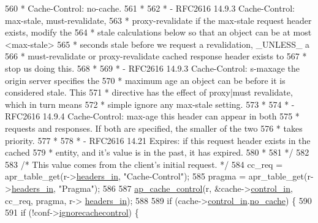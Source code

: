 \begin{DoxyCode}
560 \textcolor{comment}{     * Cache-Control: no-cache.}
561 \textcolor{comment}{     *}
562 \textcolor{comment}{     * - RFC2616 14.9.3 Cache-Control: max-stale, must-revalidate,}
563 \textcolor{comment}{     * proxy-revalidate if the max-stale request header exists, modify the}
564 \textcolor{comment}{     * stale calculations below so that an object can be at most <max-stale>}
565 \textcolor{comment}{     * seconds stale before we request a revalidation, \_UNLESS\_ a}
566 \textcolor{comment}{     * must-revalidate or proxy-revalidate cached response header exists to}
567 \textcolor{comment}{     * stop us doing this.}
568 \textcolor{comment}{     *}
569 \textcolor{comment}{     * - RFC2616 14.9.3 Cache-Control: s-maxage the origin server specifies the}
570 \textcolor{comment}{     * maximum age an object can be before it is considered stale. This}
571 \textcolor{comment}{     * directive has the effect of proxy|must revalidate, which in turn means}
572 \textcolor{comment}{     * simple ignore any max-stale setting.}
573 \textcolor{comment}{     *}
574 \textcolor{comment}{     * - RFC2616 14.9.4 Cache-Control: max-age this header can appear in both}
575 \textcolor{comment}{     * requests and responses. If both are specified, the smaller of the two}
576 \textcolor{comment}{     * takes priority.}
577 \textcolor{comment}{     *}
578 \textcolor{comment}{     * - RFC2616 14.21 Expires: if this request header exists in the cached}
579 \textcolor{comment}{     * entity, and it's value is in the past, it has expired.}
580 \textcolor{comment}{     *}
581 \textcolor{comment}{     */}
582 
583     \textcolor{comment}{/* This value comes from the client's initial request. */}
584     cc\_req = apr\_table\_get(r->\hyperlink{structrequest__rec_a5497da6c01af49acf70a4a9b975c1c83}{headers\_in}, \textcolor{stringliteral}{"Cache-Control"});
585     pragma = apr\_table\_get(r->\hyperlink{structrequest__rec_a5497da6c01af49acf70a4a9b975c1c83}{headers\_in}, \textcolor{stringliteral}{"Pragma"});
586 
587     \hyperlink{group__MOD__CACHE_ga22e3955e21c6e60450101eb1e3c6919b}{ap\_cache\_control}(r, &cache->\hyperlink{structcache__request__rec_aaea78b272eb05f1ba67a75bd6264b4df}{control\_in}, cc\_req, pragma, r->
      \hyperlink{structrequest__rec_a5497da6c01af49acf70a4a9b975c1c83}{headers\_in});
588 
589     \textcolor{keywordflow}{if} (cache->\hyperlink{structcache__request__rec_aaea78b272eb05f1ba67a75bd6264b4df}{control\_in}.\hyperlink{structcache__control_a76e5095344c47d185ef638ba1b66f267}{no\_cache}) \{
590 
591         \textcolor{keywordflow}{if} (!conf->\hyperlink{structcache__server__conf_a2372aa3f5b681975bd629bb1c865735d}{ignorecachecontrol}) \{

\end{DoxyCode}
